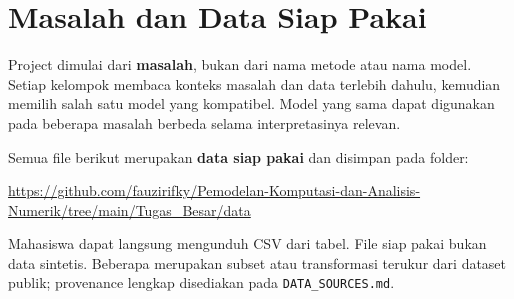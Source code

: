 \documentclass[11pt,a4paper]{article}
\begin{document}
\section{Masalah dan Data Siap Pakai}

Project dimulai dari \textbf{masalah}, bukan dari nama metode atau nama model. Setiap kelompok membaca konteks masalah dan data terlebih dahulu, kemudian memilih salah satu model yang kompatibel. Model yang sama dapat digunakan pada beberapa masalah berbeda selama interpretasinya relevan.

Semua file berikut merupakan \textbf{data siap pakai} dan disimpan pada folder:
\begin{center}
\url{https://github.com/fauzirifky/Pemodelan-Komputasi-dan-Analisis-Numerik/tree/main/Tugas_Besar/data}
\end{center}

Mahasiswa dapat langsung mengunduh CSV dari tabel. File siap pakai bukan data sintetis. Beberapa merupakan subset atau transformasi terukur dari dataset publik; provenance lengkap disediakan pada \texttt{DATA\_SOURCES.md}.
\end{document}
